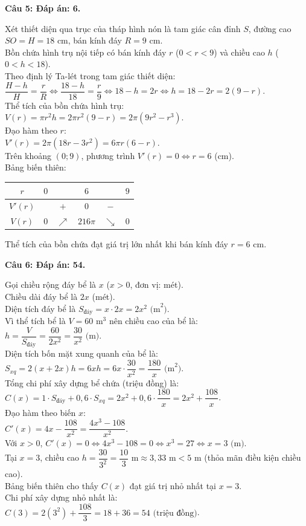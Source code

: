 \documentclass[12pt,a4paper]{article}
\newcommand{\loigiai}[1]{\par\medskip\Needspace{4\baselineskip}\noindent\textbf{#1}\par\nobreak}
\begin{document}
\loigiai{Câu 5: Đáp án: 6.}
Xét thiết diện qua trục của tháp hình nón là tam giác cân đỉnh $S$, đường cao $SO=H=18\text{ cm}$, bán kính đáy $R=9\text{ cm}$.\\
Bồn chứa hình trụ nội tiếp có bán kính đáy $r$ ($0<r<9$) và chiều cao $h$ ($0<h<18$).\\
Theo định lý Ta-lét trong tam giác thiết diện:\\
$\dfrac{H-h}{H}=\dfrac{r}{R} \iff \dfrac{18-h}{18}=\dfrac{r}{9} \iff 18-h=2r \iff h=18-2r=2(9-r)$.\\
Thể tích của bồn chứa hình trụ:\\
$V(r)=\pi r^2 h=2\pi r^2(9-r)=2\pi (9r^2-r^3)$.\\
Đạo hàm theo $r$:\\
$V'(r)=2\pi (18r-3r^2)=6\pi r(6-r)$.\\
Trên khoảng $(0;9)$, phương trình $V'(r)=0 \iff r=6$ (cm).\\
Bảng biến thiên:\\
\begin{center}
\begin{tabular}{c|ccccc}
$r$ & $0$ & & $6$ & & $9$ \\\hline
$V'(r)$ & & $+$ & $0$ & $-$ & \\\hline
$V(r)$ & $0$ & $\nearrow$ & $216\pi$ & $\searrow$ & $0$
\end{tabular}
\end{center}
Thể tích của bồn chứa đạt giá trị lớn nhất khi bán kính đáy $r=6\text{ cm}$.

\loigiai{Câu 6: Đáp án: 54.}
Gọi chiều rộng đáy bể là $x$ ($x>0$, đơn vị: mét).\\
Chiều dài đáy bể là $2x$ (mét).\\
Diện tích đáy bể là $S_{\text{đáy}}=x\cdot 2x=2x^2\text{ (m}^2\text{)}$.\\
Vì thể tích bể là $V=60\text{ m}^3$ nên chiều cao của bể là:\\
$h=\dfrac{V}{S_{\text{đáy}}}=\dfrac{60}{2x^2}=\dfrac{30}{x^2}\text{ (m)}$.\\
Diện tích bốn mặt xung quanh của bể là:\\
$S_{xq}=2(x+2x)h=6xh=6x\cdot\dfrac{30}{x^2}=\dfrac{180}{x}\text{ (m}^2\text{)}$.\\
Tổng chi phí xây dựng bể chứa (triệu đồng) là:\\
$C(x)=1\cdot S_{\text{đáy}}+0{,}6\cdot S_{xq}=2x^2+0{,}6\cdot\dfrac{180}{x}=2x^2+\dfrac{108}{x}$.\\
Đạo hàm theo biến $x$:\\
$C'(x)=4x-\dfrac{108}{x^2}=\dfrac{4x^3-108}{x^2}$.\\
Với $x>0$, $C'(x)=0 \iff 4x^3-108=0 \iff x^3=27 \iff x=3\text{ (m)}$.\\
Tại $x=3$, chiều cao $h=\dfrac{30}{3^2}=\dfrac{10}{3}\text{ m}\approx 3{,}33\text{ m}<5\text{ m}$ (thỏa mãn điều kiện chiều cao).\\
Bảng biến thiên cho thấy $C(x)$ đạt giá trị nhỏ nhất tại $x=3$.\\
Chi phí xây dựng nhỏ nhất là:\\
$C(3)=2(3^2)+\dfrac{108}{3}=18+36=54\text{ (triệu đồng)}$.
\end{document}
